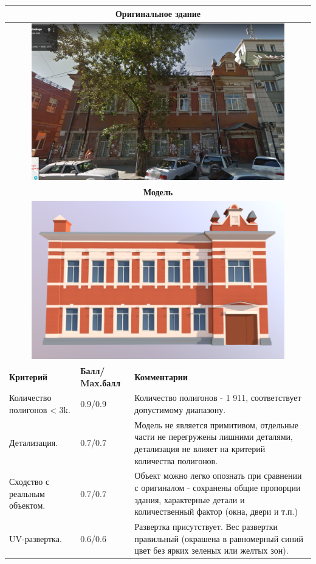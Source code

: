 \begin{longtable}{|p{4cm}|p{2.5cm}|p{7.5cm}|}
    \hline
    \multicolumn{3}{|c|}{\textbf{Оригинальное здание} } \\
    \hline
    \multicolumn{3}{|c|}{\includegraphics[width=11cm]{4}} \\
    \hline
    \multicolumn{3}{|c|}{\textbf{Модель}} \\
    \hline
    \multicolumn{3}{|c|}{\includegraphics[width=11cm]{src/model_5}} \\
    \hline
    \textbf{Критерий} & \textbf{Балл/ Max.балл} & \textbf{Комментарии} \\
    \hline
    Количество полигонов < 3k. & 0.9/0.9 & Количество полигонов - 1 911, соответствует допустимому диапазону. \\
    \hline
    Детализация. & 0.7/0.7 & Модель не является примитивом, отдельные части не перегружены лишними деталями, детализация не влияет на критерий количества полигонов. \\
    \hline
    Сходство с реальным объектом. & 0.7/0.7 & Объект можно легко опознать при сравнении с оригиналом - сохранены общие пропорции здания, характерные детали и количественный фактор (окна, двери и т.п.) \\
    \hline
    UV-развертка. & 0.6/0.6 & Развертка присутствует. Вес развертки правильный (окрашена в равномерный синий цвет без ярких зеленых или желтых зон).


\end{longtable}
